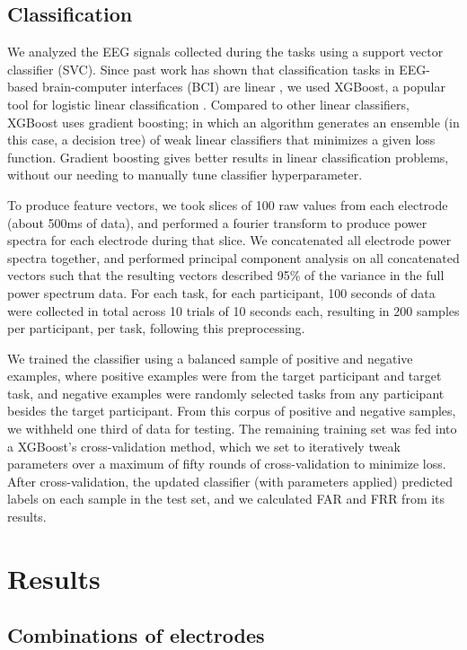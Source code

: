 \documentclass{sigchi}
\begin{document}
\subsection{Classification}

We analyzed the EEG signals collected during the tasks using a support vector classifier (SVC). Since past work has shown that classification tasks in EEG-based brain-computer interfaces (BCI) are linear \cite{Garrett2003a}, we used XGBoost, a popular tool for logistic linear classification \cite{Chen2016}. Compared to other linear classifiers, XGBoost uses gradient boosting; in which an algorithm generates an ensemble (in this case, a decision tree) of weak linear classifiers that minimizes a given loss function. Gradient boosting gives better results in linear classification problems, without our needing to manually tune classifier hyperparameter.

To produce feature vectors, we took slices of 100 raw values from each electrode (about 500ms of data), and performed a fourier transform to produce power spectra for each electrode during that slice. We concatenated all electrode power spectra together, and performed principal component analysis on all concatenated vectors such that the resulting vectors described 95\% of the variance in the full power spectrum data. For each task, for each participant, 100 seconds of data were collected in total across 10 trials of 10 seconds each, resulting in 200 samples per participant, per task, following this preprocessing.

We trained the classifier using a balanced sample of positive and negative examples, where positive examples were from the target participant and target task, and negative examples were randomly selected tasks from any participant besides the target participant. From this corpus of positive and negative samples, we withheld one third of data for testing. The remaining training set was fed into a XGBoost's cross-validation method, which we set to iteratively tweak parameters over a maximum of fifty rounds of cross-validation to minimize loss. After cross-validation, the updated classifier (with parameters applied) predicted labels on each sample in the test set, and we calculated FAR and FRR from its results.

\section{Results}
\subsection{Combinations of electrodes}
\end{document}
